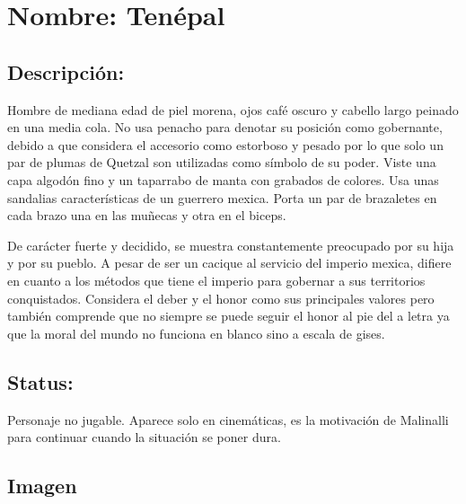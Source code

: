 \section{Nombre: Tenépal}  \label{per:tenepal}
\subsection{Descripción:}   
Hombre de mediana edad de piel morena, ojos café oscuro y cabello largo peinado en una media cola. No usa penacho para denotar su posición como gobernante, debido a que considera el accesorio como estorboso y pesado por lo que solo un par de plumas de Quetzal son utilizadas como símbolo de su poder. Viste una capa algodón fino y un taparrabo de manta con grabados de colores. Usa unas sandalias características de un guerrero mexica. Porta un par de brazaletes en cada brazo una en las muñecas y otra en el biceps.
\\
\par
De carácter fuerte y decidido, se muestra constantemente preocupado por su hija y por su pueblo. A pesar de ser un cacique al servicio del imperio mexica, difiere en cuanto a los métodos que tiene el imperio para gobernar a sus territorios conquistados. Considera el deber y el honor como sus principales valores pero también comprende que no siempre se puede seguir el honor al pie del a letra ya que la moral del mundo no funciona en blanco sino a escala de gises. 
\subsection{Status:}
Personaje no jugable.
Aparece solo en cinemáticas, es la motivación de Malinalli para continuar cuando la situación se poner dura. 
\subsection{Imagen}
